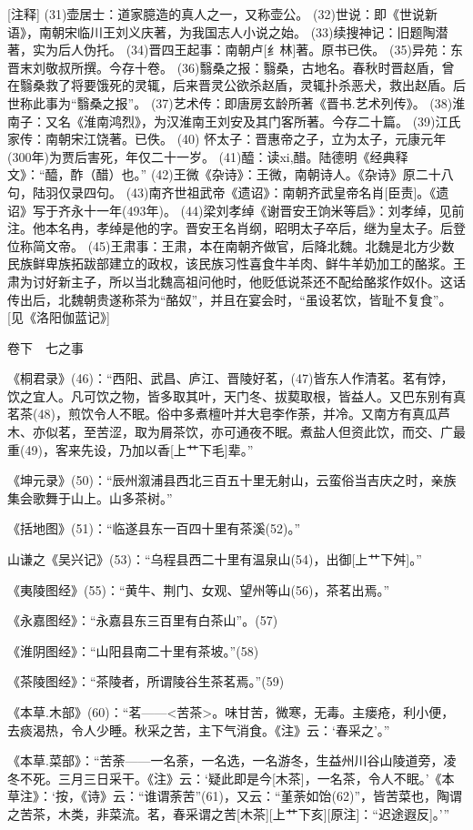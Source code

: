 \documentclass[12pt,UTF8]{ctexbook}
\begin{document}
[注释]
(31)壶居士：道家臆造的真人之一，又称壶公。
(32)世说：即《世说新语》，南朝宋临川王刘义庆著，为我国志人小说之始。
(33)续搜神记：旧题陶潜著，实为后人伪托。
(34)晋四王起事：南朝卢[纟林]著。原书已佚。
(35)异苑：东晋末刘敬叔所撰。今存十卷。
(36)翳桑之报：翳桑，古地名。春秋时晋赵盾，曾在翳桑救了将要饿死的灵辄，后来晋灵公欲杀赵盾，灵辄扑杀恶犬，救出赵盾。后世称此事为“翳桑之报”。
(37)艺术传：即唐房玄龄所著《晋书.艺术列传》。
(38)淮南子：又名《淮南鸿烈》，为汉淮南王刘安及其门客所著。今存二十篇。
(39)江氏家传：南朝宋江饶著。已佚。
(40) 怀太子：晋惠帝之子，立为太子，元康元年(300年)为贾后害死，年仅二十一岁。
(41)醯：读xi,醋。陆德明《经典释文》：“醯，酢（醋）也。”
(42)王微《杂诗》：王微，南朝诗人。《杂诗》原二十八句，陆羽仅录四句。
(43)南齐世祖武帝《遗诏》：南朝齐武皇帝名肖[臣责]。《遗诏》写于齐永十一年(493年)。
(44)梁刘孝绰《谢晋安王饷米等启》：刘孝绰，见前注。他本名冉，孝绰是他的字。晋安王名肖纲，昭明太子卒后，继为皇太子。后登位称简文帝。 
(45)王肃事：王肃，本在南朝齐做官，后降北魏。北魏是北方少数民族鲜卑族拓跋部建立的政权，该民族习性喜食牛羊肉、鲜牛羊奶加工的酪浆。王肃为讨好新主子，所以当北魏高祖问他时，他贬低说茶还不配给酪浆作奴仆。这话传出后，北魏朝贵遂称茶为“酪奴”，并且在宴会时，“虽设茗饮，皆耻不复食”。[见《洛阳伽蓝记》]

卷下　七之事

《桐君录》(46)：“西阳、武昌、庐江、晋陵好茗，(47)皆东人作清茗。茗有饽，饮之宜人。凡可饮之物，皆多取其叶，天门冬、拔葜取根，皆益人。又巴东别有真茗茶(48)，煎饮令人不眠。俗中多煮檀叶并大皂李作荼，并冷。又南方有真瓜芦木、亦似茗，至苦涩，取为屑茶饮，亦可通夜不眠。煮盐人但资此饮，而交、广最重(49)，客来先设，乃加以香[上艹下毛]辈。”

《坤元录》(50)：“辰州溆浦县西北三百五十里无射山，云蛮俗当吉庆之时，亲族集会歌舞于山上。山多茶树。”

《括地图》(51)：“临遂县东一百四十里有茶溪(52)。”

山谦之《吴兴记》(53)：“乌程县西二十里有温泉山(54)，出御[上艹下舛]。”

《夷陵图经》(55)：“黄牛、荆门、女观、望州等山(56)，茶茗出焉。”

《永嘉图经》：“永嘉县东三百里有白茶山”。(57)

《淮阴图经》：“山阳县南二十里有茶坡。”(58)

《茶陵图经》：“茶陵者，所谓陵谷生茶茗焉。”(59)

《本草.木部》(60)：“茗——<苦茶>。味甘苦，微寒，无毒。主瘘疮，利小便，去痰渴热，令人少睡。秋采之苦，主下气消食。《注》云：‘春采之’。”

《本草.菜部》：“苦荼——一名荼，一名选，一名游冬，生益州川谷山陵道旁，凌冬不死。三月三日采干。《注》云：‘疑此即是今[木茶]，一名茶，令人不眠。’《本草注》：‘按，《诗》云：“谁谓荼苦”(61)，又云：“堇荼如饴(62)”，皆苦菜也，陶谓之苦茶，木类，非菜流。茗，春采谓之苦[木茶][上艹下亥][原注]：“迟途遐反]。’”
\end{document}
